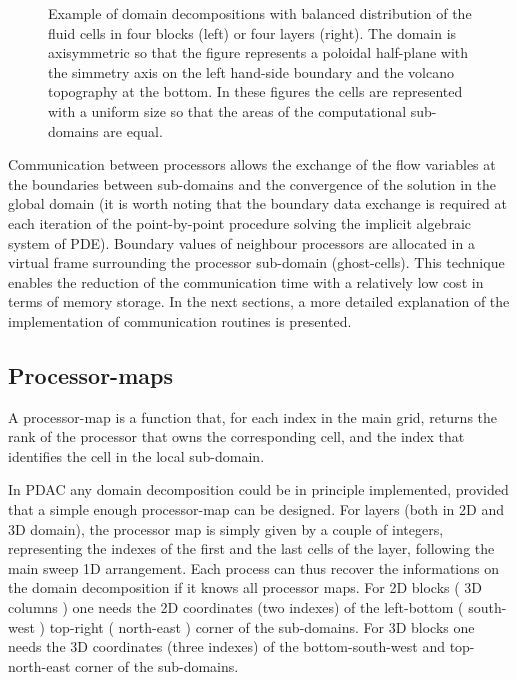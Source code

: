 \begin{enumerate}
%
\begin{figure}[htb]
\setlength{\unitlength}{1mm}
\begin{center}
\begin{minipage}{6cm}
\centerline{}
\end{minipage}
\begin{minipage}{6cm}
\centerline{}
\end{minipage}
\begin{minipage}{6cm}
\centerline{}
\end{minipage}
\end{center}
\caption{Example of domain decompositions with balanced distribution of
the fluid cells in four blocks (left) or four layers (right).
The domain is axisymmetric so that the figure represents a poloidal
half-plane with the simmetry axis on the left hand-side boundary and
the volcano topography at the bottom. In these figures the cells are represented
with a uniform size so that the areas of the computational sub-domains
are equal.\label{fig:Ves_part}}
\end{figure}
%

Communication between processors allows the exchange of the flow variables
at the boundaries between sub-domains and the convergence of the solution
in the global domain (it is worth noting that the
boundary data exchange is required at each iteration of the point-by-point
procedure solving the implicit algebraic system of PDE).
Boundary values of neighbour processors are allocated in a virtual
frame surrounding the processor sub-domain (ghost-cells). This technique
enables the reduction of the communication time with a relatively low cost
in terms of memory storage.
In the next sections, a more detailed explanation of the implementation of communication
routines is presented.
%
\subsection{Processor-maps}
A processor-map is a function that, for each index in the main grid, returns the rank
of the processor that owns the corresponding cell, and the index that identifies the
cell in the local sub-domain.

In PDAC any domain decomposition could be in principle implemented, provided that a 
simple enough processor-map can be designed.
For layers (both in 2D and 3D domain), the processor map is simply given by a couple of integers,
representing the indexes of the first and the last cells of the layer, following
the main sweep 1D arrangement.  Each process can thus recover
the informations on the domain decomposition if it knows all processor maps.
For 2D blocks ( 3D columns ) one needs the 2D coordinates (two indexes) of the left-bottom ( south-west )
top-right ( north-east ) corner of the sub-domains.
For 3D blocks one needs the 3D coordinates (three indexes) of the bottom-south-west and
top-north-east corner of the sub-domains.


\end{enumerate}
